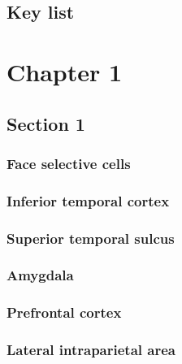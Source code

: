 \documentclass[man, 10pt, a4paper]{book}
\begin{document}
\newpage
\begin{multicols}{3}
\section*{Key list}
{\footnotesize }
\end{multicols}


 
\chapter{Chapter 1}
 
\section{Section 1}  

\subsection{Face selective cells}\label{Face selective cells}

\subsection{Inferior temporal cortex}\label{Inferior temporal cortex}

\subsection{Superior temporal sulcus}\label{Superior temporal sulcus}

\subsection{Amygdala}\label{Amygdala}

\subsection{Prefrontal cortex}\label{Prefrontal cortex}

\subsection{Lateral intraparietal area}\label{Lateral intraparietal area}
\end{document}
